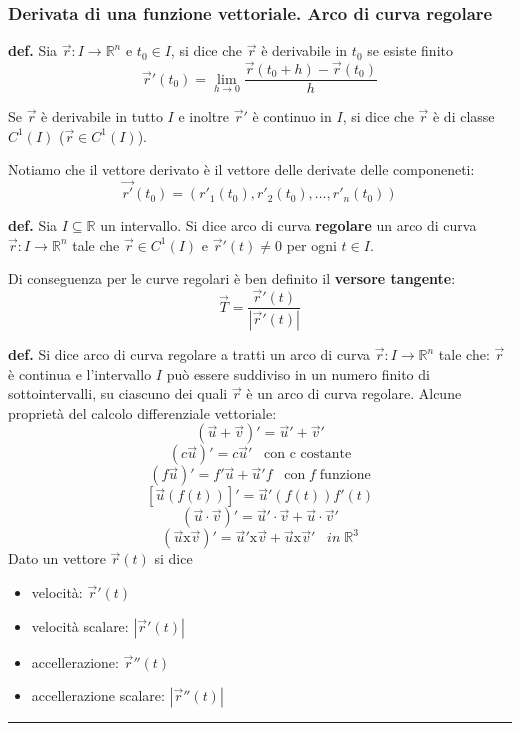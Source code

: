 \subsubsection{Derivata di una funzione vettoriale. Arco di curva regolare}
\textbf{def.} Sia $\vec{r}: I \rightarrow \mathbb{R}^n$ e $t_0 \in I$, si dice che $\vec{r}$ è derivabile in $t_0$ se esiste finito
\[
    \vec{r}'(t_0) = \lim_{h\rightarrow 0}\frac{\vec{r}(t_0 +h) - \vec{r}(t_0)}{h}
\]
\begin{tcolorbox}
Se $\vec{r}$ è derivabile in tutto $I$ e inoltre $\vec{r}'$ è continuo in $I$, si dice che $\vec{r}$ è di classe $C^1(I)$ ($\vec{r}\in C^1(I)$).
\end{tcolorbox}
\begin{tcolorbox}
Notiamo che il vettore derivato è il vettore delle derivate delle componeneti:
\[
    \vec{r'}(t_0) = (r'_1(t_0), r'_2(t_0), \dots, r'_n(t_0))
\]
\end{tcolorbox}
\begin{tcolorbox}
\textbf{def.} Sia $I \subseteq \mathbb{R}$ un intervallo. Si dice arco di curva \textbf{regolare} un arco di curva $\vec{r}: I \rightarrow  \mathbb{R}^n$ tale che $\vec{r} \in C^1(I)$ e $\vec{r}'(t) \neq 0$ per ogni $t \in I$.
\end{tcolorbox}
\begin{tcolorbox}
Di conseguenza per le curve regolari è ben definito il \textbf{versore tangente}:
\[
    \vec{T} = \frac{\vec{r}'(t)}{|\vec{r}'(t)|}
\]
\end{tcolorbox}
\textbf{def.} Si dice arco di curva regolare a tratti un arco di curva $\vec{r} : I \rightarrow \mathbb{R}^n$ tale che: $\vec{r}$ è continua e l'intervallo $I$ può essere suddiviso in un numero finito di sottointervalli, su ciascuno dei quali $\vec{r}$ è un arco di curva regolare.\newline
\newline
Alcune proprietà del calcolo differenziale vettoriale:
\[
    (\vec{u} + \vec{v})' = \vec{u}' + \vec{v}'
\]
\[
    (c \vec{u})' = c \vec{u}' \;\;\; \text{con c costante}
\]
\[
    (f \vec{u})' = f' \vec{u} + \vec{u}' f \;\;\;\text{con} \; f \; \text{funzione}
\]
\[
    [\vec{u}(f(t))]' = \vec{u}'(f(t))f'(t)
\]
\[
    (\vec{u} \cdot \vec{v})' = \vec{u}' \cdot  \vec{v} + \vec{u} \cdot  \vec{v}'
\]
\[
    (\vec{u} \text{x} \vec{v})' = \vec{u}' \text{x} \vec{v} + \vec{u} \text{x} \vec{v}' \;\;\; in \;\mathbb{R}^3
\]
Dato un vettore $\vec{r}(t)$ si dice
\begin{itemize}
    \item velocità: $\vec{r}'(t)$
    \item velocità scalare: $|\vec{r}'(t)|$
    \item accellerazione: $\vec{r}''(t)$
    \item accellerazione scalare: $|\vec{r}''(t)|$
\end{itemize}
\rule{\textwidth}{0,4pt}
